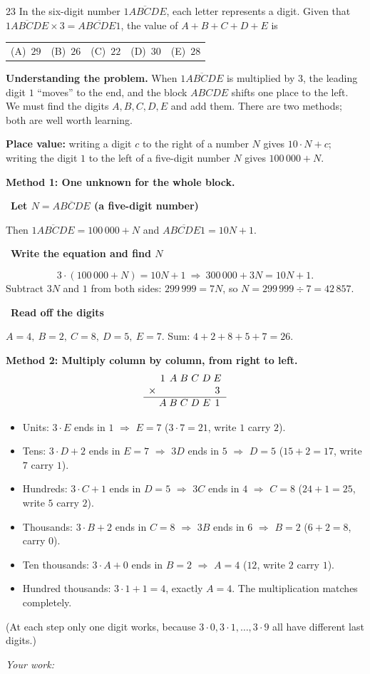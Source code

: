\documentclass[11pt]{article}
\makeatletter
\newif\ifsol \solfalse
\newenvironment{probbox}[2]{\begin{probboxT}{#1}{#2}}{\end{probboxT}}
\newcommand{\StuProb}[2]{\begin{probboxS}{#1}{#2}\StuProbBody\end{probboxS}}
\newcommand{\probsol}[1]{%
  \begin{lrbox}{\solmeasure}\begin{minipage}{\dimexpr\linewidth-24pt\relax}#1\end{minipage}\end{lrbox}%
  \ifsol
    \begin{solbox}#1\end{solbox}%
  \else
    \setlength{\solht}{\dimexpr\ht\solmeasure+\dp\solmeasure+0.85cm\relax}%
    \ifdim\solht<1.35cm\setlength{\solht}{1.35cm}\fi
    \ifdim\solht>\StudentMaxWork\setlength{\solht}{\StudentMaxWork}\fi
    \par\noindent\begin{minipage}{\linewidth}%
    \expandafter\StuProb\StuProbArgs
    \begin{tcolorbox}[colback=white,colframe=Line,boxrule=0.8pt,arc=5pt,
      left=8pt,right=8pt,top=4pt,bottom=4pt,height=\solht]{\footnotesize\color{Slate}\itshape\WorkWord}\end{tcolorbox}%
    \end{minipage}\par\medskip
  \fi}
\newcommand{\nd}[1]{\overline{#1}}
\newlength{\StudentMaxWork}\setlength{\StudentMaxWork}{4.5cm}
\newcommand{\step}[2]{\par\smallskip\noindent{\bfseries\color{tmBlue!85!black}\StepWord~#1.}\ {\bfseries #2}\par\nopagebreak}
\newcommand{\choices}[5]{\par\smallskip\noindent
  \begin{tabularx}{\linewidth}{@{}XXXXX@{}}(A)\ #1&(B)\ #2&(C)\ #3&(D)\ #4&(E)\ #5\end{tabularx}\par}
\def\WorkWord{Your work:}
\def\StepWord{Step}
\makeatother
\begin{document}
\begin{probbox}{23}{\relax}
In the six-digit number $\nd{1ABCDE}$, each letter represents a digit. Given that $\nd{1ABCDE}\times 3=\nd{ABCDE1}$, the value of $A+B+C+D+E$ is
\choices{$29$}{$26$}{$22$}{$30$}{$28$}
\end{probbox}
\probsol{
\textbf{Understanding the problem.} When $\nd{1ABCDE}$ is multiplied by $3$, the leading digit $1$ ``moves'' to the end, and the block $ABCDE$ shifts one place to the left. We must find the digits $A,B,C,D,E$ and add them. There are two methods; both are well worth learning.

\begin{recallbox}\textbf{Place value:} writing a digit $c$ to the right of a number $N$ gives $10\cdot N+c$; writing the digit $1$ to the left of a five-digit number $N$ gives $100\,000+N$.\end{recallbox}

\textbf{Method 1: One unknown for the whole block.}
\step{1}{Let $N=\nd{ABCDE}$ (a five-digit number)}
Then $\nd{1ABCDE}=100\,000+N$ and $\nd{ABCDE1}=10N+1$.
\step{2}{Write the equation and find $N$}
\[3\cdot(100\,000+N)=10N+1\ \Longrightarrow\ 300\,000+3N=10N+1.\]
Subtract $3N$ and $1$ from both sides: $299\,999=7N$, so $N=299\,999\div 7=42\,857$.
\step{3}{Read off the digits}
$A=4,\ B=2,\ C=8,\ D=5,\ E=7$. Sum: $4+2+8+5+7=26$.

\textbf{Method 2: Multiply column by column, from right to left.}
\[\begin{array}{r@{\;}c@{\;}c@{\;}c@{\;}c@{\;}c@{\;}c}
 & 1 & A & B & C & D & E\\
\times & & & & & & 3\\ \hline
 & A & B & C & D & E & 1
\end{array}\]
\begin{itemize}[leftmargin=1.4em,itemsep=1pt]
\item Units: $3\cdot E$ ends in $1$ $\Rightarrow$ $E=7$ ($3\cdot 7=21$, write $1$ carry $2$).
\item Tens: $3\cdot D+2$ ends in $E=7$ $\Rightarrow$ $3D$ ends in $5$ $\Rightarrow$ $D=5$ ($15+2=17$, write $7$ carry $1$).
\item Hundreds: $3\cdot C+1$ ends in $D=5$ $\Rightarrow$ $3C$ ends in $4$ $\Rightarrow$ $C=8$ ($24+1=25$, write $5$ carry $2$).
\item Thousands: $3\cdot B+2$ ends in $C=8$ $\Rightarrow$ $3B$ ends in $6$ $\Rightarrow$ $B=2$ ($6+2=8$, carry $0$).
\item Ten thousands: $3\cdot A+0$ ends in $B=2$ $\Rightarrow$ $A=4$ ($12$, write $2$ carry $1$).
\item Hundred thousands: $3\cdot 1+1=4$, exactly $A=4$. The multiplication matches completely.
\end{itemize}
(At each step only one digit works, because $3\cdot 0, 3\cdot 1,\dots,3\cdot 9$ all have different last digits.)

}
\end{document}
